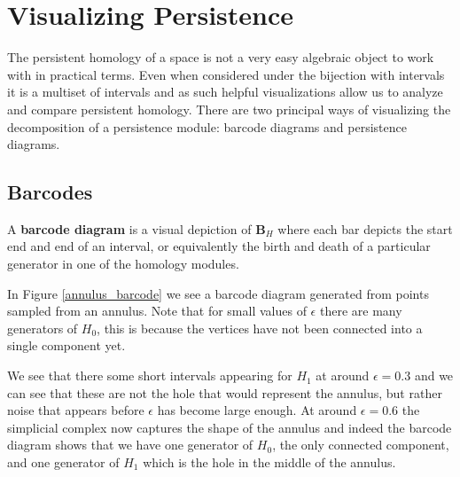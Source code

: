 \section{Visualizing Persistence}
The persistent homology of a space is not a very easy algebraic object to work with in practical terms. Even when considered under the bijection with intervals it is a multiset of intervals and as such helpful visualizations allow us to analyze and compare persistent homology. There are two principal ways of visualizing the decomposition of a persistence module: barcode diagrams and persistence diagrams.

\subsection{Barcodes}
A \textbf{barcode diagram} is a visual depiction of $\textbf{B}_{H}$ where each bar depicts the start end and end of an interval, or equivalently the birth and death of a particular generator in one of the homology modules.

In Figure \ref{annulus_barcode} we see a barcode diagram generated from points sampled from an annulus. Note that for small values of $\epsilon$ there are many generators of $H_{0}$, this is because the vertices have not been connected into a single component yet.

  We see that there some short intervals appearing for $H_{1}$ at around $\epsilon=0.3$ and we can see that these are not the hole that would represent the annulus, but rather noise that appears before $\epsilon$ has become large enough. At around $\epsilon=0.6$ the simplicial complex now captures the shape of the annulus and indeed the barcode diagram shows that we have one generator of $H_{0}$, the only connected component, and one generator of $H_{1}$ which is the hole in the middle of the annulus.


